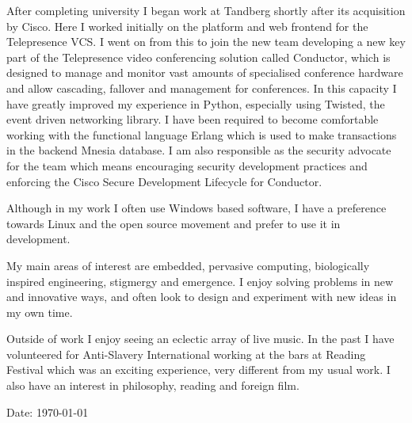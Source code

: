 \documentclass[overlapped,line,letterpaper]{res}
\begin{document}
\begin{resume}
After completing university I began work at Tandberg shortly after its acquisition
by Cisco.
Here I worked initially on the platform and web frontend for the
Telepresence VCS.
I went on from this to join the new team developing a new key part of the
Telepresence video conferencing solution called Conductor, which is designed
to manage and monitor vast amounts of specialised conference hardware and
allow cascading, fallover and management for conferences.
In this capacity I have greatly improved my experience in Python, especially
using Twisted, the event driven networking library.
I have been required to become comfortable working with the functional
language Erlang which is used to make transactions in the backend Mnesia database.
I am also responsible as the security advocate for the team which means encouraging
security development practices and enforcing the Cisco Secure Development Lifecycle
for Conductor.

Although in my work I often use Windows based software, I have a preference towards
Linux and the open source movement and prefer to use it in development.

My main areas of interest are embedded, pervasive computing, biologically
inspired engineering, stigmergy and emergence.
I enjoy solving problems in new and innovative ways, and often look to design and
experiment with new ideas in my own time.

Outside of work I enjoy seeing an eclectic array of live music. In the past I
have volunteered for Anti-Slavery International working at the bars at Reading
Festival which was an exciting experience, very different from my usual work.
I also have an interest in philosophy, reading and foreign film.


\begin{center}
{\tiny \rm $ $Date: \today $ $ }
\end{center}

\end{resume}
\end{document}
